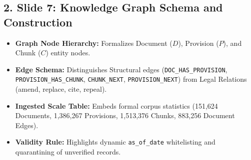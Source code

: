 \documentclass[10pt]{article}
\begin{document}
\subsection*{2. Slide 7: Knowledge Graph Schema and Construction}
\begin{itemize}
    \item \textbf{Graph Node Hierarchy:} Formalizes Document ($D$), Provision ($P$), and Chunk ($C$) entity nodes.
    \item \textbf{Edge Schema:} Distinguishes Structural edges (\texttt{DOC\_HAS\_PROVISION}, \texttt{PROVISION\_HAS\_CHUNK}, \texttt{CHUNK\_NEXT}, \texttt{PROVISION\_NEXT}) from Legal Relations (amend, replace, cite, repeal).
    \item \textbf{Ingested Scale Table:} Embeds formal corpus statistics (151,624 Documents, 1,386,267 Provisions, 1,513,376 Chunks, 883,256 Document Edges).
    \item \textbf{Validity Rule:} Highlights dynamic \texttt{as\_of\_date} whitelisting and quarantining of unverified records.
\end{itemize}
\end{document}
